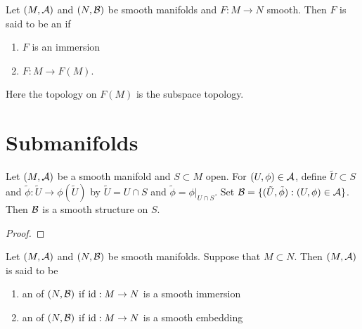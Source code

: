 \documentclass{book}
\begin{document}
	\begin{defn}
	Let $(M, \mathcal{A})$ and $(N, \mathcal{B})$ be smooth manifolds and $F:M \rightarrow N$ smooth. Then $F$ is said to be an  if 
	\begin{enumerate}
	\item $F$ is an immersion
	\item $F:M \rightarrow F(M)$. 
\end{enumerate}	 
	\end{defn}	

	\begin{note}
	Here the topology on $F(M)$ is the subspace topology.
	\end{note}
	

	
	
	
	
	
	
	
	
	
	
	\newpage
	\section{Submanifolds}
	
	
	\begin{ex}
	Let $(M, \mathcal{A})$ be a smooth manifold and $S \subset M$ open. For $(U, \phi) \in \mathcal{A}$, define $\tilde{U} \subset S$ and $\tilde{\phi}: \tilde{U} \rightarrow \phi(\tilde{U})$ by $\tilde{U} = U \cap S$ and $\tilde{\phi} = \phi|_{U \cap S}$. Set $\mathcal{B} = \{(\tilde{U}, \tilde{\phi}): (U, \phi) \in \mathcal{A}\}$.
	Then $\mathcal{B}$ is a smooth structure on $S$.
	\end{ex}
	
	\begin{proof}
	
	\end{proof}
	
	
	
	\newpage

	\begin{defn}
		Let $(M, \mathcal{A})$ and  $(N, \mathcal{B})$ be smooth manifolds. Suppose that $M \subset N$. Then $(M, \mathcal{A})$ is said to be 
		\begin{enumerate}
		\item an  of $(N, \mathcal{B})$ if $\operatorname{id}:M \rightarrow N$ is a smooth immersion
		\item an  of $(N, \mathcal{B})$ if $\operatorname{id}:M \rightarrow N$ is a smooth embedding
		\end{enumerate}
	\end{defn}
	
\end{document}
